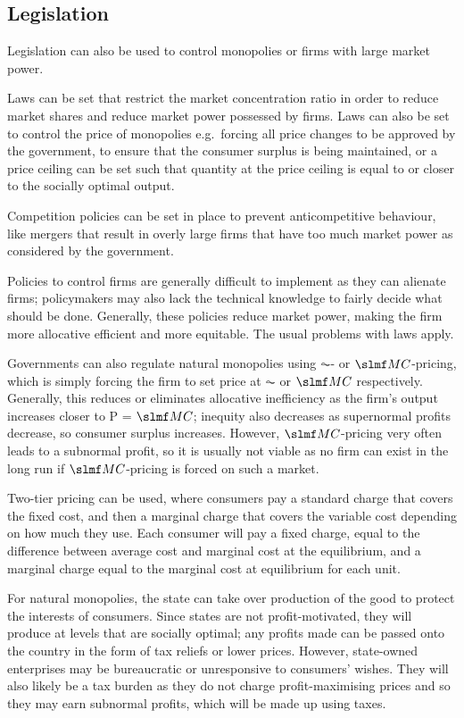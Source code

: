 \documentclass[Economics.tex]{subfiles}
\begin{document}
\subsection{Legislation}
Legislation can also be used to control monopolies or firms with large market power.

Laws can be set that restrict the market concentration ratio in order to reduce market shares and reduce market power possessed by firms. Laws can also be set to control the price of monopolies e.g.\ forcing all price changes to be approved by the government, to ensure that the consumer surplus is being maintained, or a price ceiling can be set such that quantity at the price ceiling is equal to or closer to the socially optimal output.

Competition policies can be set in place to prevent anticompetitive behaviour, like mergers that result in overly large firms that have too much market power as considered by the government.

Policies to control firms are generally difficult to implement as they can alienate firms; policymakers may also lack the technical knowledge to fairly decide what should be done. Generally, these policies reduce market power, making the firm more allocative efficient and more equitable. The usual problems with laws apply.

Governments can also regulate natural monopolies using \(\AC\)- or \(\mrg{C}\)-pricing, which is simply forcing the firm to set price at \(\AC\) or \(\mrg{C}\) respectively. Generally, this reduces or eliminates allocative inefficiency as the firm's output increases closer to P = \(\mrg{C}\); inequity also decreases as supernormal profits decrease, so consumer surplus increases. However, \(\mrg{C}\)-pricing very often leads to a subnormal profit, so it is usually not viable as no firm can exist in the long run if \(\mrg{C}\)-pricing is forced on such a market.

Two-tier pricing can be used, where consumers pay a standard charge that covers the fixed cost, and then a marginal charge that covers the variable cost depending on how much they use. Each consumer will pay a fixed charge, equal to the difference between average cost and marginal cost at the equilibrium, and a marginal charge equal to the marginal cost at equilibrium for each unit.

For natural monopolies, the state can take over production of the good to protect the interests of consumers. Since states are not profit-motivated, they will produce at levels that are socially optimal; any profits made can be passed onto the country in the form of tax reliefs or lower prices. However, state-owned enterprises may be bureaucratic or unresponsive to consumers' wishes. They will also likely be a tax burden as they do not charge profit-maximising prices and so they may earn subnormal profits, which will be made up using taxes.
\end{document}
